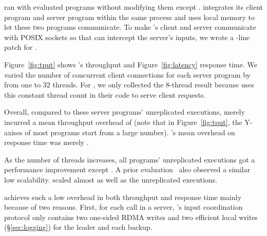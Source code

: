 
\xxx ran with \nprog evaluated programs without modifying them except
\calvin. \calvin integrates its client program and server program within the
same process and uses local memory to let these two programs communicate. To
make \calvin's client and server communicate with POSIX sockets so that \xxx
can intercept the server's inputs, we wrote a \nlinescalvin-line patch for
\calvin.

Figure~\ref{fig:tput} shows \xxx's throughput and Figure~\ref{fig:latency}
response time. We varied the number of concurrent client connections for each
server program by from one to 32 threads. For \calvin, we only collected the
8-thread result because \calvin uses this constant thread count in their code
to serve client requests.

Overall, compared to these server programs' unreplicated executions, \xxx 
merely incurred a mean throughput overhead of \tputoverhead (note that in 
Figure~\ref{fig:tput}, the Y-axises of most programs start from a large 
number). \xxx's mean overhead on response time was merely \latencyoverhead.

As the number of threads increases, all programs' unreplicated executions
got a performance improvement except \memcached. A prior
evaluation~\cite{rex:eurosys14} also observed a similar \memcached low
scalability. \xxx scaled almost as well as the unreplicated executions.

\xxx achieves such a low overhead in both throughput and response time mainly
because of two reasons. First, for each \recv call in a server, \xxx's input
coordination protocol only contains two one-sided RDMA writes and two efficient 
local writes (\S\ref{sec:logging}) for the leader and each backup.


